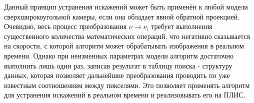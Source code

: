 Данный принцип устранения искажений может быть применён к любой модели сверхширокоугольной камеры, если
она обладает явной обратной проекцией. Очевидно, весь процесс преобразования $\nu \rightarrow \nu_i$ требует 
выполнения существенного количества математических операций, что негативно сказывается на скорости, с 
которой алгоритм может обрабатывать изображения в реальном времени. Однако при неизменных параметрах 
модели алгоритм достаточно выполнить лишь один раз, записав результат в таблицу поиска - структуру данных, 
которая позволяет дальнейшие преобразования проводить по уже известным соотношениям между пикселями. Это 
позволяет применять алгоритм для устранения искажений в реальном времени и реализовывать его на ПЛИС.










